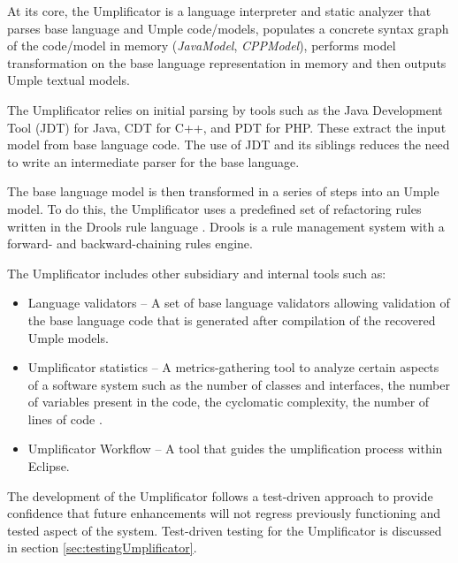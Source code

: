 
At its core, the Umplificator is a language interpreter and static analyzer that parses base language and Umple code/models, populates a concrete syntax graph of the code/model in memory (\textit{JavaModel}, \textit{CPPModel}), performs model transformation on the base language representation in memory and then outputs Umple textual models.

The Umplificator relies on initial parsing by tools such as the Java Development Tool (JDT) for Java, CDT for C++, and PDT for PHP. These extract the input model from base language code. The use of JDT and its siblings reduces the need to write an intermediate parser for the base language.

The base language model is then transformed in a series of steps into an Umple model. To do this, the Umplificator uses a predefined set of refactoring rules written in the Drools rule language \cite{Drools_Book}. Drools is a rule management system with a forward- and backward-chaining rules engine. 

The Umplificator includes other subsidiary and internal tools such as:
\begin{itemize}
\item Language validators – A set of base language validators allowing validation of the base language code that is generated after compilation of the recovered Umple models.
\item Umplificator statistics –  A metrics-gathering tool to analyze certain aspects of a software system such as the number of classes and interfaces, the  number of variables present in the code, the cyclomatic complexity, the number of lines of code \cite{MetricsBuse}.  
\item Umplificator Workflow – A tool that guides the umplification process within Eclipse.
\end{itemize}

The development of the Umplificator follows a test-driven approach to provide confidence that future enhancements will not regress previously functioning and tested aspect of the system. Test-driven testing for the Umplificator is discussed in section \ref{sec:testingUmplificator}. 

